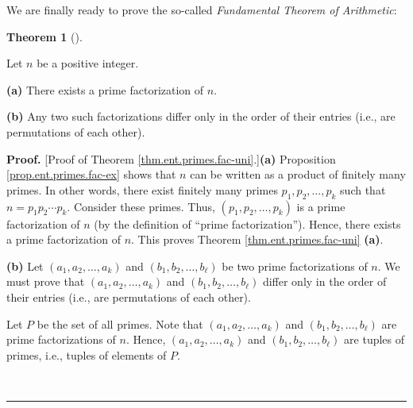 \documentclass[numbers=enddot,12pt,final,onecolumn,notitlepage]{scrartcl}%
\numberwithin{exer}{subsection}
\theoremstyle{definition}
\newtheorem{theo}{Theorem}[subsection]
\newenvironment{theorem}[1][]
{\begin{theo}[#1]\begin{leftbar}}
{\end{leftbar}\end{theo}}
\newenvironment{proof}[1][Proof]{\noindent\textbf{#1.} }{\ \rule{0.5em}{0.5em}}
\begin{document}
We are finally ready to prove the so-called \textit{Fundamental Theorem of
Arithmetic}:

\begin{theorem}
\label{thm.ent.primes.fac-uni}Let $n$ be a positive integer.

\textbf{(a)} There exists a prime factorization of $n$.

\textbf{(b)} Any two such factorizations differ only in the order of their
entries (i.e., are permutations of each other).
\end{theorem}

\begin{proof}
[Proof of Theorem \ref{thm.ent.primes.fac-uni}.]\textbf{(a)} Proposition
\ref{prop.ent.primes.fac-ex} shows that $n$ can be written as a product of
finitely many primes. In other words, there exist finitely many primes
$p_{1},p_{2},\ldots,p_{k}$ such that $n=p_{1}p_{2}\cdots p_{k}$. Consider
these primes. Thus, $\left(  p_{1},p_{2},\ldots,p_{k}\right)  $ is a prime
factorization of $n$ (by the definition of \textquotedblleft prime
factorization\textquotedblright). Hence, there exists a prime factorization of
$n$. This proves Theorem \ref{thm.ent.primes.fac-uni} \textbf{(a)}.

\textbf{(b)} Let $\left(  a_{1},a_{2},\ldots,a_{k}\right)  $ and $\left(
b_{1},b_{2},\ldots,b_{\ell}\right)  $ be two prime factorizations of $n$. We
must prove that $\left(  a_{1},a_{2},\ldots,a_{k}\right)  $ and $\left(
b_{1},b_{2},\ldots,b_{\ell}\right)  $ differ only in the order of their
entries (i.e., are permutations of each other).

Let $P$ be the set of all primes. Note that $\left(  a_{1},a_{2},\ldots
,a_{k}\right)  $ and $\left(  b_{1},b_{2},\ldots,b_{\ell}\right)  $ are prime
factorizations of $n$. Hence, $\left(  a_{1},a_{2},\ldots,a_{k}\right)  $ and
$\left(  b_{1},b_{2},\ldots,b_{\ell}\right)  $ are tuples of primes, i.e.,
tuples of elements of $P$.


\end{proof}
\end{document}
